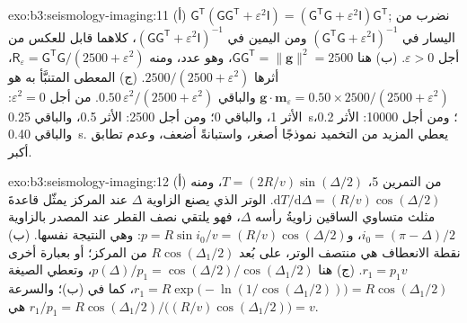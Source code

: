 \begin{solution}{exo:b3:seismology-imaging:11}
(أ) $\mathsf G^{\mathsf T}(\mathsf G\mathsf G^{\mathsf T} + \varepsilon^2\mathsf I)
= (\mathsf G^{\mathsf T}\mathsf G + \varepsilon^2\mathsf I)\mathsf G^{\mathsf T}$;
نضرب من اليسار في $(\mathsf G^{\mathsf T}\mathsf G + \varepsilon^2
\mathsf I)^{-1}$ ومن اليمين في $(\mathsf G\mathsf G^{\mathsf T} +
\varepsilon^2\mathsf I)^{-1}$، كلاهما قابل للعكس من أجل $\varepsilon > 0$.
(ب) هنا $\mathsf G\mathsf G^{\mathsf T} = \|\mathbf g\|^2 = 2500$، وهو عدد،
ومنه $\mathsf R_\varepsilon = \mathsf G^{\mathsf T}\mathsf G/(2500 + \varepsilon^2)$،
أثرها $2500/(2500 + \varepsilon^2)$. (ج) المعطى المتنبَّأ به هو
$\mathbf g\cdot\mathbf m_\varepsilon = 0.50\times2500/(2500 + \varepsilon^2)$
والباقي $0.50\,\varepsilon^2/(2500 + \varepsilon^2)$. من أجل
$\varepsilon^2 = 0$: الأثر 1، والباقي 0؛ ومن أجل 2500: الأثر 0.5، والباقي
\qty{0.25}{s}؛ ومن أجل \num{10000}: الأثر 0.2، والباقي \qty{0.40}{s}. يعطي المزيد من التخميد
نموذجًا أصغر، واستبانةً أضعف، وعدم تطابق أكبر.
\end{solution}

\begin{solution}{exo:b3:seismology-imaging:12}
(أ) من التمرين 5، $T = (2R/v)\sin(\Delta/2)$، ومنه $\mathrm dT/\mathrm d\Delta
= (R/v)\cos(\Delta/2)$. الوتر الذي يصنع الزاوية $\Delta$ عند المركز يمثّل
قاعدةَ مثلث متساوي الساقين زاويةُ رأسه $\Delta$، فهو يلتقي نصف القطر
عند المصدر بالزاوية $i_0 = (\pi - \Delta)/2$، و$p = R\sin i_0/v =
(R/v)\cos(\Delta/2)$: وهي النتيجة نفسها. (ب) نقطة الانعطاف هي منتصف
الوتر، على بُعد $R\cos(\Delta_1/2)$ من المركز؛ أو بعبارة أخرى
$r_1 = p_1v$. (ج) هنا $p(\Delta)/p_1 = \cos(\Delta/2)/\cos(\Delta_1/2)$،
وتعطي الصيغة $r_1 = R\exp\bigl(-\ln(1/\cos(\Delta_1/2))\bigr) =
R\cos(\Delta_1/2)$، كما في (ب)؛ والسرعة هي $r_1/p_1 = R\cos(\Delta_1/2)\big/
\bigl((R/v)\cos(\Delta_1/2)\bigr) = v$.
\end{solution}

